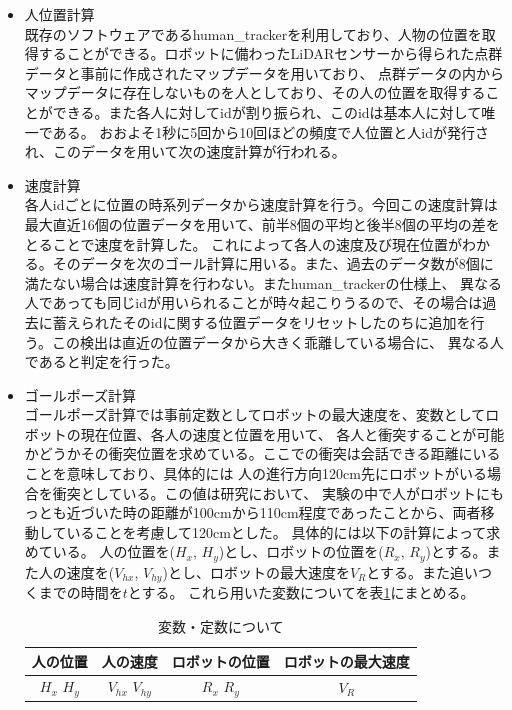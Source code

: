 \documentclass{kuisthesis}
\begin{document}
\begin{itemize}
  \item 人位置計算 \\
  既存のソフトウェアであるhuman\_trackerを利用しており、人物の位置を取得することができる。ロボットに備わったLiDARセンサーから得られた点群データと事前に作成されたマップデータを用いており、
  点群データの内からマップデータに存在しないものを人としており、その人の位置を取得することができる。また各人に対してidが割り振られ、このidは基本人に対して唯一である。
  おおよそ1秒に5回から10回ほどの頻度で人位置と人idが発行され、このデータを用いて次の速度計算が行われる。
  \item 速度計算 \\
  各人idごとに位置の時系列データから速度計算を行う。今回この速度計算は最大直近16個の位置データを用いて、前半8個の平均と後半8個の平均の差をとることで速度を計算した。
これによって各人の速度及び現在位置がわかる。そのデータを次のゴール計算に用いる。また、過去のデータ数が8個に満たない場合は速度計算を行わない。またhuman\_trackerの仕様上、
異なる人であっても同じidが用いられることが時々起こりうるので、その場合は過去に蓄えられたそのidに関する位置データをリセットしたのちに追加を行う。この検出は直近の位置データから大きく乖離している場合に、
異なる人であると判定を行った。
  \item ゴールポーズ計算 \\
  ゴールポーズ計算では事前定数としてロボットの最大速度を、変数としてロボットの現在位置、各人の速度と位置を用いて、
各人と衝突することが可能かどうかその衝突位置を求めている。ここでの衝突は会話できる距離にいることを意味しており、具体的には
人の進行方向120cm先にロボットがいる場合を衝突としている。この値は研究\cite{mumm2011human}において、
実験の中で人がロボットにもっとも近づいた時の距離が100cmから110cm程度であったことから、両者移動していることを考慮して120cmとした。
具体的には以下の計算によって求めている。
人の位置を($H_x$, $H_y$)とし、ロボットの位置を($R_x$, $R_y$)とする。また人の速度を($V_{hx}$, $V_{hy}$)とし、ロボットの最大速度を$V_R$とする。また追いつくまでの時間を$t$とする。
これら用いた変数についてを表\ref{fig: variable}にまとめる。
\begin{table}[H]
  \centering
  \caption{変数・定数について}
  \label{fig: variable}
  \begin{tabular}{|c|c|c|c|}
    \hline
    人の位置 & 人の速度 & ロボットの位置 & ロボットの最大速度 \\ \hline
    $H_x$  $H_y$ & $V_{hx}$  $V_{hy}$ & $R_x$  $R_y$ & $V_R$ \\ \hline
  \end{tabular}
  

\end{table}
\end{itemize}
\end{document}
